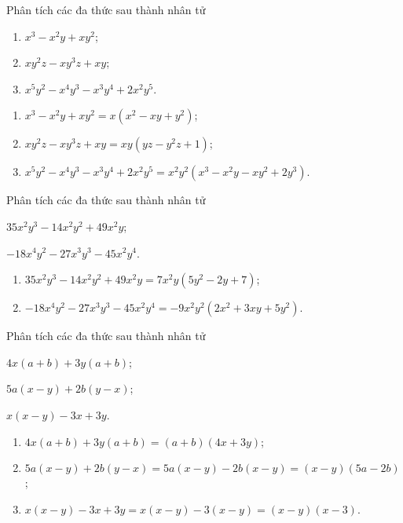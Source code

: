 \begin{vd}
	Phân tích các đa thức sau thành nhân tử	
	\begin{enumerate}
	\item $x^3 -x^2y+xy^2$;
	\item $xy^2z-xy^3z+xy$;
	\item $x^5y^2 - x^4y^3 -x^3y^4+2x^2y^5$.
\end{enumerate}
	\loigiai
	{
		\begin{enumerate}
			\item $x^3 -x^2y+xy^2 = x \left(x^2 -xy+y^2 \right) $;
			\item $xy^2z-xy^3z+xy = xy \left(yz -y^2z+1 \right) $;
				\item $x^5y^2 - x^4y^3 -x^3y^4+2x^2y^5 = x^2y^2 \left( x^3 -x^2y -xy^2+2y^3 \right) $.
		\end{enumerate}	
	}
\end{vd}

\begin{vd} 
		Phân tích các đa thức sau thành nhân tử	
	\begin{listEX}[2] 
			\item $35x^2y^3-14x^2y^2+49x^2y$;
		\item $-18x^4y^2-27x^3y^3-45x^2y^4$.
	\end{listEX}
	\loigiai
	{
		\begin{enumerate}
			\item $35x^2y^3-14x^2y^2+49x^2y= 7x^2y \left(5y^2-2y+7 \right) $;
			\item $-18x^4y^2-27x^3y^3-45x^2y^4 = -9x^2y^2 \left( 2x^2 + 3xy +5y^2\right) $.
		\end{enumerate}	
	}
\end{vd}

\begin{vd}
		Phân tích các đa thức sau thành nhân tử
	\begin{listEX}[3] 
		\item $4x(a+b)+3y(a+b)$;
		\item $5a(x-y)+2b(y-x)$;
		\item $x(x-y) -3x+3y$.
	\end{listEX}
	\loigiai
	{
		\begin{enumerate}
			\item $4x(a+b)+3y(a+b) = (a+b)(4x+3y)$;
			\item  $5a(x-y)+2b(y-x) =  5a(x-y)-2b(x-y) = (x-y)(5a-2b)$;
				\item $x(x-y) -3x+3y = x(x-y)-3(x-y) = (x-y)(x-3)$.
		\end{enumerate}		
	}
\end{vd}

